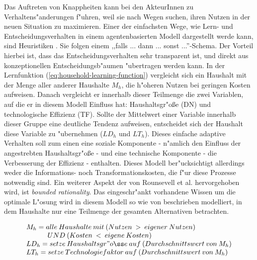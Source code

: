 \documentclass[11pt,a4paper]{article}
\begin{document}
Das Auftreten von Knappheiten kann bei den AkteurInnen zu Verhaltens\-"and\-erungen f"uhren, weil sie nach Wegen suchen, ihren Nutzen in der neuen Situation zu maximieren. Einer der einfachsten Wege, wie Lern- und Entscheidungsverhalten in einem agentenbasierten Modell dargestellt werde kann, sind Heuristiken \citep{Rounsevell2012}. Sie folgen einem ,,falls ... dann ... sonst ...''-Schema. Der Vorteil hierbei ist, dass das Entscheidungsverhalten sehr transparent ist, und direkt aus konzeptionellen Entscheidungsb"aumen "ubertragen werden kann. In der Lernfunktion (\ref{eq:household-learning-function}) vergleicht sich ein Haushalt mit der Menge aller anderer Haushalte $M_{h}$, die h"oheren Nutzen bei geringen Kosten aufweisen. Danach vergleicht er innerhalb dieser Teilmenge die zwei Variablen, auf die er in diesem Modell Einfluss hat: Haushaltsgr"oße (DN) und technologische Effizienz (TF). Sollte der Mittelwert einer Variable innerhalb dieser Gruppe eine deutliche Tendenz aufweisen, entscheidet sich der Haushalt diese Variable zu "ubernehmen ($LD_{h}$ und $LT_{h}$). Dieses einfache adaptive Verhalten soll zum einen eine soziale Komponente - n"amlich den Einfluss der angestrebten Haushaltsgr"oße - und eine technische Komponente - die Verbesserung der Effizienz - enthalten. Dieses Modell ber"ucksichtigt allerdings weder die Informations- noch Transformationskosten, die f"ur diese Prozesse notwendig sind. Ein weiterer Aspekt der von Rounsevell et al. hervorgehoben wird, ist \textit{bounded rationality}. Das eingeschr"ankt vorhandene Wissen um die optimale L"osung wird in diesem Modell so wie von \cite{Rounsevell2012} beschrieben modelliert, in dem Haushalte nur eine Teilmenge der gesamten Alternativen betrachten.

\begin{dmath}
\begin{array}[h]{l}
M_{h} = alle\:Haushalte\:mit\:(Nutzen\:>\:eigener\:Nutzen)\\
\;\;\;\;\;\;\;\;\;\;\;UND\:(Kosten\:<\:eigene\:Kosten)\\
LD_{h} = setze\:Haushaltsgr"oße\:auf\:(Durchschnittswert\:von\:M_{h})\\
LT_{h} = setze\:Technologiefaktor\:auf\:(Durchschnittswert\:von\:M_{h})
\end{array}
\label{eq:household-learning-function}
\end{dmath}
\end{document}
